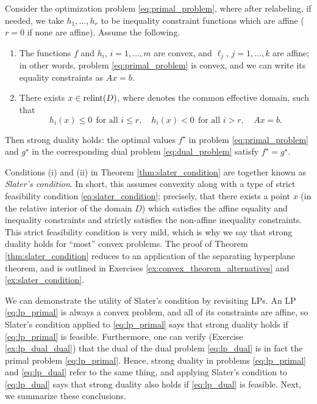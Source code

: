 \begin{Theorem}
\label{thm:slater_condition}
Consider the optimization problem \eqref{eq:primal_problem}, where after 
relabeling, if needed, we take $h_1, \dots, h_r$ to be inequality constraint
functions which are affine ($r = 0$ if none are affine). Assume the following.         

\begin{enumerate}[label=(\roman*)]
\item The functions $f$ and $h_i$, $i=1,\dots,m$ are convex, and $\ell_j$,
  $j=1,\dots,k$ are affine; in other words, problem \eqref{eq:primal_problem} is
  convex, and we can write its equality constraints as $Ax = b$.      

\item There exists $x \in \operatorname{relint}(D)$, where  denotes the common effective domain, such that      
  \begin{equation}
  \label{eq:slater_condition}
  h_i(x) \leq 0 \;\, \text{for all $i \leq r$}, \quad
  h_i(x) < 0 \;\, \text{for all $i > r$}, \quad Ax = b. 
  \end{equation}
\end{enumerate}

Then strong duality holds: the optimal values $f^\star$ in problem
\eqref{eq:primal_problem} and $g^\star$ in the corresponding dual problem  
\eqref{eq:dual_problem} satisfy $f^\star = g^\star$. 
\end{Theorem}

Conditions (i) and (ii) in Theorem \ref{thm:slater_condition} are together known
as \emph{Slater's condition}. In short, this assumes convexity along with a
type of strict feasibility condition \eqref{eq:slater_condition}; precisely,
that there exists a point $x$ (in the relative interior of the domain $D$) which 
satisfies the affine equality and inequality constraints and strictly satisfies  
the non-affine inequality constraints. This strict feasibility condition is very
mild, which is why we say that strong duality holds for ``most'' convex
problems. The proof of Theorem \ref{thm:slater_condition} reduces to an
application of the separating hyperplane theorem, and is outlined in Exercises 
\ref{ex:convex_theorem_alternatives} and \ref{ex:slater_condition}.  

We can demonstrate the utility of Slater's condition by revisiting LPs. An LP
\eqref{eq:lp_primal} is always a convex problem, and all of its constraints are
affine, so Slater's condition applied to \eqref{eq:lp_primal} says that strong
duality holds if \eqref{eq:lp_primal} is feasible. Furthermore, one can verify
(Exercise \ref{ex:lp_dual_dual}) that the dual of the dual problem
\eqref{eq:lp_dual} is in fact the primal problem \eqref{eq:lp_primal}. Hence,
strong duality in problems \eqref{eq:lp_primal} and \eqref{eq:lp_dual} refer to
the same thing, and applying Slater's condition to \eqref{eq:lp_dual} says that 
strong duality also holds if \eqref{eq:lp_dual} is feasible. Next, we summarize
these conclusions. 

